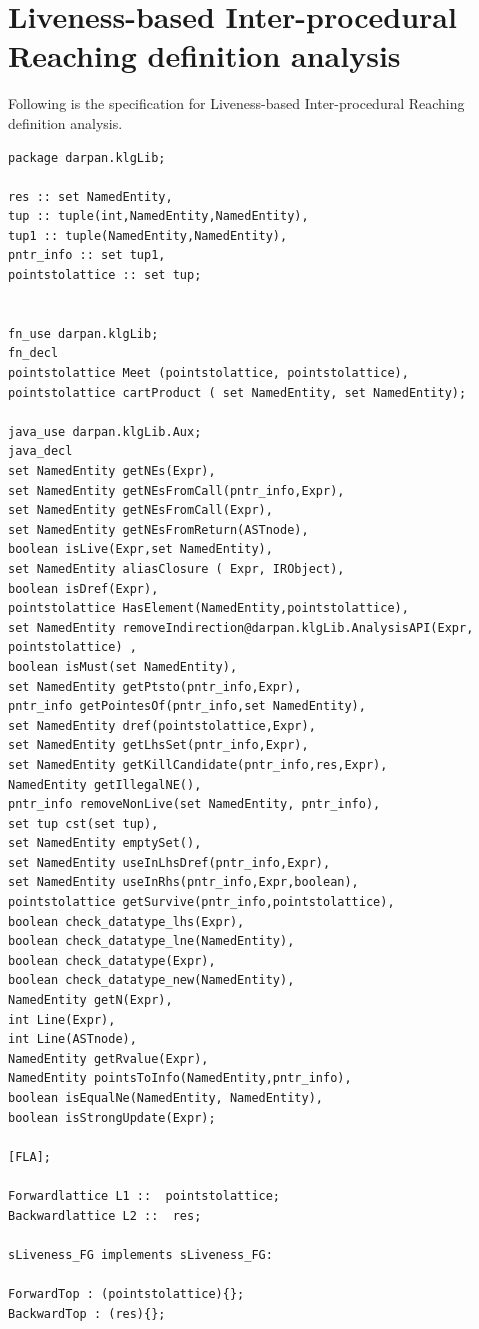 \documentclass[11pt,a4paper,openright]{report}
\begin{document}
\section{Liveness-based Inter-procedural Reaching definition analysis}
Following is the specification for Liveness-based Inter-procedural Reaching definition analysis.

\begin{lstlisting}
package darpan.klgLib;

res :: set NamedEntity,
tup :: tuple(int,NamedEntity,NamedEntity),
tup1 :: tuple(NamedEntity,NamedEntity),
pntr_info :: set tup1,
pointstolattice :: set tup;


fn_use darpan.klgLib;
fn_decl
pointstolattice Meet (pointstolattice, pointstolattice),
pointstolattice cartProduct ( set NamedEntity, set NamedEntity);

java_use darpan.klgLib.Aux;
java_decl
set NamedEntity getNEs(Expr),
set NamedEntity getNEsFromCall(pntr_info,Expr),
set NamedEntity getNEsFromCall(Expr),
set NamedEntity getNEsFromReturn(ASTnode),
boolean isLive(Expr,set NamedEntity),
set NamedEntity aliasClosure ( Expr, IRObject),
boolean isDref(Expr),
pointstolattice HasElement(NamedEntity,pointstolattice),
set NamedEntity removeIndirection@darpan.klgLib.AnalysisAPI(Expr, pointstolattice) ,
boolean isMust(set NamedEntity),
set NamedEntity getPtsto(pntr_info,Expr),
pntr_info getPointesOf(pntr_info,set NamedEntity),
set NamedEntity dref(pointstolattice,Expr),
set NamedEntity getLhsSet(pntr_info,Expr),
set NamedEntity getKillCandidate(pntr_info,res,Expr),
NamedEntity getIllegalNE(),
pntr_info removeNonLive(set NamedEntity, pntr_info),
set tup cst(set tup),
set NamedEntity emptySet(),
set NamedEntity useInLhsDref(pntr_info,Expr),
set NamedEntity useInRhs(pntr_info,Expr,boolean),
pointstolattice	getSurvive(pntr_info,pointstolattice),
boolean check_datatype_lhs(Expr),
boolean check_datatype_lne(NamedEntity),
boolean check_datatype(Expr),
boolean check_datatype_new(NamedEntity),
NamedEntity getN(Expr),
int Line(Expr),
int Line(ASTnode),
NamedEntity getRvalue(Expr),
NamedEntity pointsToInfo(NamedEntity,pntr_info),
boolean isEqualNe(NamedEntity, NamedEntity),
boolean isStrongUpdate(Expr);

[FLA];

Forwardlattice L1 ::  pointstolattice; 
Backwardlattice L2 ::  res;

sLiveness_FG implements sLiveness_FG:

ForwardTop : (pointstolattice){};
BackwardTop : (res){};


\end{lstlisting}
\end{document}
